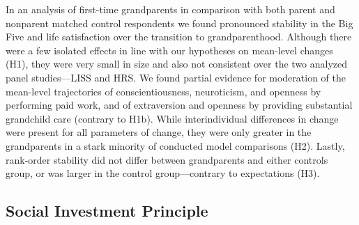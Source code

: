 \documentclass[
  english,
  man, noextraspace]{apa7}
\begin{document}
In an analysis of first-time grandparents in comparison with both parent and nonparent matched control respondents we found pronounced stability in the Big Five and life satisfaction over the transition to grandparenthood. Although there were a few isolated effects in line with our hypotheses on mean-level changes (H1), they were very small in size and also not consistent over the two analyzed panel studies---LISS and HRS. We found partial evidence for moderation of the mean-level trajectories of conscientiousness, neuroticism, and openness by performing paid work, and of extraversion and openness by providing substantial grandchild care (contrary to H1b). While interindividual differences in change were present for all parameters of change, they were only greater in the grandparents in a stark minority of conducted model comparisons (H2). Lastly, rank-order stability did not differ between grandparents and either controls group, or was larger in the control group---contrary to expectations (H3).

\hypertarget{social-investment-principle}{%
\subsection{Social Investment Principle}\label{social-investment-principle}}
\end{document}
